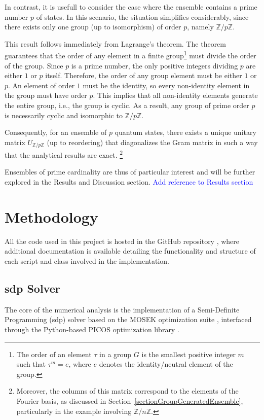 \documentclass[12pt,letterpaper]{article}
\begin{document}
\begin{multicols}{2}
In contrast, it is usefull to consider the case where the ensemble contains a prime number $p$ of states. In this scenario, the situation simplifies considerably, since there exists only one group (up to isomorphism) of order $p$, namely $\mathbb{Z}/p\mathbb{Z}$.

This result follows immediately from Lagrange's theorem. The theorem guarantees that the order of any element in a finite group\footnote{The order of an element $\tau$ in a group $G$ is the smallest positive integer $m$ such that $\tau^m = e$, where $e$ denotes the identity/neutral element of the group.} must divide the order of the group. Since $p$ is a prime number, the only positive integers dividing $p$ are either $1$ or $p$ itself. Therefore, the order of any group element must be either $1$ or $p$. An element of order $1$ must be the identity, so every non-identity element in the group must have order $p$. This implies that all non-identity elements generate the entire group, i.e., the group is cyclic. As a result, any group of prime order $p$ is necessarily cyclic and isomorphic to $\mathbb{Z}/p\mathbb{Z}$.

Consequently, for an ensemble of $p$ quantum states, there exists a unique unitary matrix $U_{\mathbb{Z}/p\mathbb{Z}}$ (up to reordering) that diagonalizes the Gram matrix in such a way that the analytical results are exact. \footnote{Moreover, the columns of this matrix correspond to the elements of the Fourier basis, as discussed in Section~\ref{sectionGroupGeneratedEnsemble}, particularly in the example involving $\mathbb{Z}/n\mathbb{Z}$.}

Ensembles of prime cardinality are thus of particular interest and will be further explored in the Results and Discussion section. \textcolor{blue}{Add reference to Results section}
\section{Methodology}

All the code used in this project is hosted in the GitHub repository \cite{GitHub}, where additional documentation is available detailing the functionality and structure of each script and class involved in the implementation.

\subsection{\gls{sdp} Solver}

The core of the numerical analysis is the implementation of a Semi-Definite Programming (\gls{sdp}) solver based on the MOSEK optimization suite \cite{mosek_sdp}, interfaced through the Python-based PICOS optimization library \cite{PICOS}. 


\end{multicols}
\end{document}
